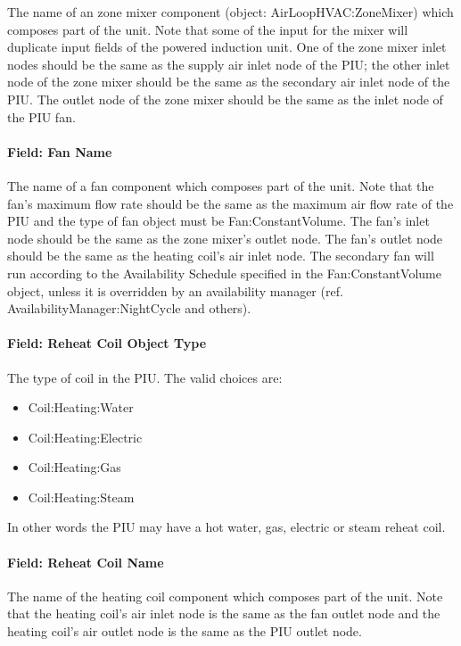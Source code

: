 The name of an zone mixer component (object: AirLoopHVAC:ZoneMixer) which composes part of the unit. Note that some of the input for the mixer will duplicate input fields of the powered induction unit. One of the zone mixer inlet nodes should be the same as the supply air inlet node of the PIU; the other inlet node of the zone mixer should be the same as the secondary air inlet node of the PIU. The outlet node of the zone mixer should be the same as the inlet node of the PIU fan.

\paragraph{Field: Fan Name}\label{field-fan-name-1}

The name of a fan component which composes part of the unit. Note that the fan's maximum flow rate should be the same as the maximum air flow rate of the PIU and the type of fan object must be Fan:ConstantVolume. The fan's inlet node should be the same as the zone mixer's outlet node. The fan's outlet node should be the same as the heating coil's air inlet node. The secondary fan will run according to the Availability Schedule specified in the Fan:ConstantVolume object, unless it is overridden by an availability manager (ref. AvailabilityManager:NightCycle and others).

\paragraph{Field: Reheat Coil Object Type}\label{field-reheat-coil-object-type-3}

The type of coil in the PIU. The valid choices are:

\begin{itemize}
\item
  Coil:Heating:Water
\item
  Coil:Heating:Electric
\item
  Coil:Heating:Gas
\item
  Coil:Heating:Steam
\end{itemize}

In other words the PIU may have a hot water, gas, electric or steam reheat coil.

\paragraph{Field: Reheat Coil Name}\label{field-reheat-coil-name-3}

The name of the heating coil component which composes part of the unit. Note that the heating coil's air inlet node is the same as the fan outlet node and the heating coil's air outlet node is the same as the PIU outlet node.


